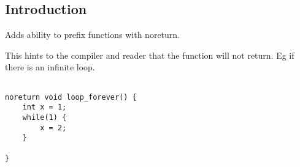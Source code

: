 
\subsection{Introduction}

Adds ability to prefix functions with noreturn.

This hints to the compiler and reader that the function will not return. Eg if there is an infinite loop.

\begin{verbatim}

noreturn void loop_forever() {
    int x = 1;
    while(1) {
        x = 2;
    }

}
\end{verbatim}


